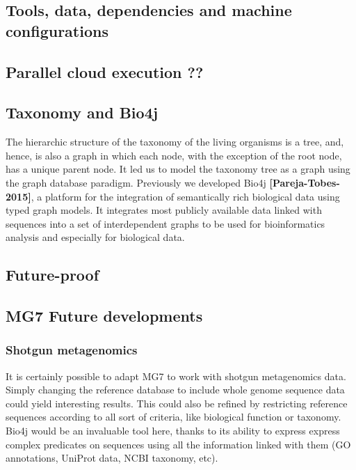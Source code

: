 \documentclass{frontiersSCNS} %
\begin{document}
\subsection{Tools, data, dependencies and machine
configurations}\label{tools-data-dependencies-and-machine-configurations}

\subsection{Parallel cloud execution ??}\label{parallel-cloud-execution}

\subsection{Taxonomy and Bio4j}\label{taxonomy-and-bio4j}

The hierarchic structure of the taxonomy of the living organisms is a
tree, and, hence, is also a graph in which each node, with the exception
of the root node, has a unique parent node. It led us to model the
taxonomy tree as a graph using the graph database paradigm. Previously
we developed Bio4j \textbf{{[}Pareja-Tobes-2015{]}}, a platform for the
integration of semantically rich biological data using typed graph
models. It integrates most publicly available data linked with sequences
into a set of interdependent graphs to be used for bioinformatics
analysis and especially for biological data.

\subsection{Future-proof}\label{future-proof}

\subsection{MG7 Future developments}\label{mg7-future-developments}

\subsubsection{Shotgun metagenomics}\label{shotgun-metagenomics}

It is certainly possible to adapt MG7 to work with shotgun metagenomics
data. Simply changing the reference database to include whole genome
sequence data could yield interesting results. This could also be
refined by restricting reference sequences according to all sort of
criteria, like biological function or taxonomy. Bio4j would be an
invaluable tool here, thanks to its ability to express express complex
predicates on sequences using all the information linked with them (GO
annotations, UniProt data, NCBI taxonomy, etc).
\end{document}
